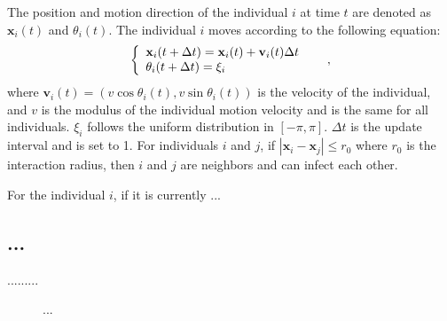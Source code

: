 \documentclass[12pt, a4paper]{article}%
\begin{document}
\begin{CJK}{UTF8}{gbsn}
The position and motion direction of the individual $i$ at time $t$ are denoted
as $\textbf{x}_i(t)$ and $\theta_i(t)$. The individual $i$ moves according to the following equation:
\begin{equation} \label{Eq:...}%
\left\{
\begin{array}{l@{\quad \quad}l}
\textbf{x}_i(t+\Delta t)=\textbf{x}_i(t)+\textbf{v}_i(t)\Delta t \\
\theta_i(t+\Delta t)=\xi_i
\end{array}
\right., \nonumber
\end{equation} %
where $\textbf{v}_i(t)= (v\cos\theta_i(t),v\sin\theta_i(t))$ is the velocity of the individual, and $v$ is the modulus
of the individual motion velocity and is the same for all individuals. $\xi_i$ follows the uniform distribution in
$[-\pi,\pi]$. $\Delta t$ is the update interval and is set to 1. For individuals $i$ and $j$, if
$\left|\textbf{x}_i-\textbf{x}_j\right|\le r_0$ where $r_0$ is the interaction radius, then $i$ and $j$ are neighbors
and can infect each other.

For the individual $i$, if it is currently ...


\subsection{...} \label{Sect:...}%
.........

\begin{figure}[htbp]\centering
{}
\hspace{0.5cm}
\hspace{0.5cm}
\hspace{0.5cm}
\vspace{-2mm}
\caption[short~Title~Here]{\label{Fig_rho_chi_tau} ...}
\end{figure}


\end{CJK}
\end{document}
